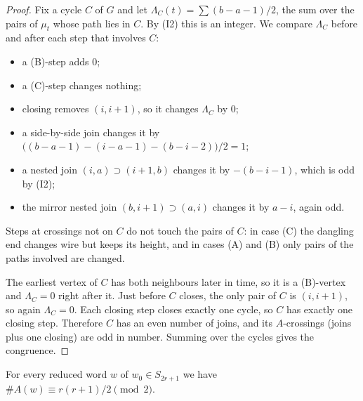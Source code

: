 \begin{proof}
Fix a cycle $C$ of $G$ and let $\Lambda_C(t)=\sum (b-a-1)/2$, the sum over the pairs of $\mu_t$ whose
path lies in $C$. By (I2) this is an integer. We compare $\Lambda_C$ before and after each step that
involves $C$:
\begin{itemize}
\item a (B)-step adds $0$;
\item a (C)-step changes nothing;
\item closing removes $(i,i+1)$, so it changes $\Lambda_C$ by $0$;
\item a side-by-side join changes it by $\bigl((b-a-1)-(i-a-1)-(b-i-2)\bigr)/2=1$;
\item a nested join $(i,a)\supset(i+1,b)$ changes it by $-(b-i-1)$, which is odd by (I2);
\item the mirror nested join $(b,i+1)\supset(a,i)$ changes it by $a-i$, again odd.
\end{itemize}
Steps at crossings not on $C$ do not touch the pairs of $C$: in case (C) the dangling end changes
wire but keeps its height, and in cases (A) and (B) only pairs of the paths involved are changed.

The earliest vertex of $C$ has both neighbours later in time, so it is a (B)-vertex and
$\Lambda_C=0$ right after it. Just before $C$ closes, the only pair of $C$ is $(i,i+1)$, so again
$\Lambda_C=0$. Each closing step closes exactly one cycle, so $C$ has exactly one closing step.
Therefore $C$ has an even number of joins, and its $A$-crossings (joins plus one closing) are odd in
number. Summing over the cycles gives the congruence.
\end{proof}

\begin{lemma}\label{lem:A}
For every reduced word $w$ of $w_0\in S_{2r+1}$ we have $\#A(w)\equiv r(r+1)/2\pmod 2$.
\end{lemma}

